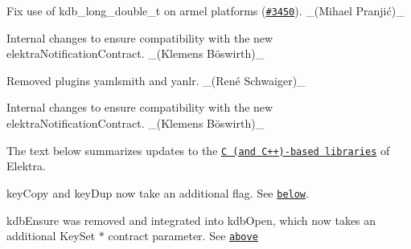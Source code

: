 \begin{DoxyItemize}
\item Fix use of {\ttfamily kdb\+\_\+long\+\_\+double\+\_\+t} on armel platforms (\href{https://github.com/ElektraInitiative/libelektra/issues/3450}{\tt \#3450}). \+\_\+(Mihael Pranjić)\+\_\+
\end{DoxyItemize}


\begin{DoxyItemize}
\item Internal changes to ensure compatibility with the new {\ttfamily elektra\+Notification\+Contract}. \+\_\+(Klemens Böswirth)\+\_\+
\end{DoxyItemize}


\begin{DoxyItemize}
\item Removed plugins {\ttfamily yamlsmith} and {\ttfamily yanlr}. \+\_\+(René Schwaiger)\+\_\+
\end{DoxyItemize}


\begin{DoxyItemize}
\item Internal changes to ensure compatibility with the new {\ttfamily elektra\+Notification\+Contract}. \+\_\+(Klemens Böswirth)\+\_\+
\end{DoxyItemize}

The text below summarizes updates to the \href{https://www.libelektra.org/libraries/readme}{\tt C (and C++)-\/based libraries} of Elektra.


\begin{DoxyItemize}
\item {\ttfamily key\+Copy} and {\ttfamily key\+Dup} now take an additional flag. See \href{#key-copy}{\tt below}.
\item {\ttfamily kdb\+Ensure} was removed and integrated into {\ttfamily kdb\+Open}, which now takes an additional {\ttfamily Key\+Set $\ast$ contract} parameter. See \href{#hl-1}{\tt above}
\end{DoxyItemize}


